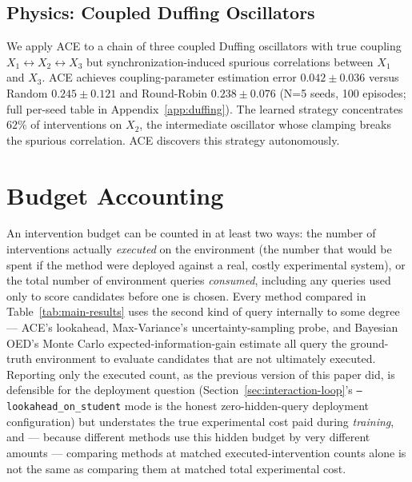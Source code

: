 \documentclass{article}
\theoremstyle{plain}
\theoremstyle{definition}
\theoremstyle{remark}
\begin{document}
\subsection{Physics: Coupled Duffing Oscillators}
\label{sec:results-duffing}

We apply ACE to a chain of three coupled Duffing oscillators \citep{kovacic2011duffing} with true coupling $X_1 \leftrightarrow X_2 \leftrightarrow X_3$ but synchronization-induced spurious correlations between $X_1$ and $X_3$. ACE achieves coupling-parameter estimation error $0.042\pm0.036$ versus Random $0.245\pm0.121$ and Round-Robin $0.238\pm0.076$ (N=5 seeds, 100 episodes; full per-seed table in Appendix~\ref{app:duffing}). The learned strategy concentrates $62\%$ of interventions on $X_2$, the intermediate oscillator whose clamping breaks the spurious correlation. ACE discovers this strategy autonomously.

\section{Budget Accounting}
\label{sec:budget}

An intervention budget can be counted in at least two ways: the number of interventions actually \emph{executed} on the environment (the number that would be spent if the method were deployed against a real, costly experimental system), or the total number of environment queries \emph{consumed}, including any queries used only to score candidates before one is chosen. Every method compared in Table~\ref{tab:main-results} uses the second kind of query internally to some degree --- ACE's lookahead, Max-Variance's uncertainty-sampling probe, and Bayesian OED's Monte Carlo expected-information-gain estimate all query the ground-truth environment to evaluate candidates that are not ultimately executed. Reporting only the executed count, as the previous version of this paper did, is defensible for the deployment question (Section~\ref{sec:interaction-loop}'s \texttt{--lookahead\_on\_student} mode is the honest zero-hidden-query deployment configuration) but understates the true experimental cost paid during \emph{training}, and --- because different methods use this hidden budget by very different amounts --- comparing methods at matched executed-intervention counts alone is not the same as comparing them at matched total experimental cost.
\end{document}
